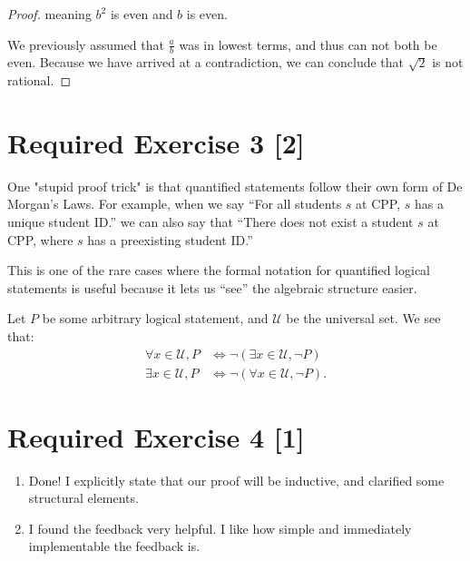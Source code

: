 \documentclass{article}
\begin{document}
\begin{enumerate}
{\begin{proof}
            meaning \(b^2\) is even and \(b\) is even. 

            We previously assumed that \(\frac{a }{b}\) was in lowest terms, and 
            thus can not both be even. Because we have arrived at a contradiction, 
            we can conclude that \(\sqrt{2}\) is not rational. 
        \end{proof}
    }
\end{enumerate}

\section*{Required Exercise 3 [2]}

One "stupid proof trick" is that quantified statements follow their own form of 
De Morgan's Laws. For example, when we say ``For all students \(s\) at CPP, \(s\) 
has a unique student ID.'' we can also say that ``There does not exist a student \(s\)
at CPP, where \(s\) has a preexisting student ID.''

This is one of the rare cases where the formal notation for quantified logical 
statements is useful because it lets us ``see'' the algebraic structure easier. 

Let \(P\) be some arbitrary logical statement, and \(\mathcal{U}\) be the universal set.
We see that:
\begin{align*}
    \forall x \in \mathcal{U}, P &\Leftrightarrow \neg (\exists x \in \mathcal{U}, \neg P)\\
    \exists x \in \mathcal{U}, P &\Leftrightarrow \neg (\forall x \in \mathcal{U}, \neg P).
\end{align*}

\section*{Required Exercise 4 [1]}
\begin{enumerate}
    \item {
        Done! I explicitly state that our proof will be inductive, and clarified 
        some structural elements. 
    }
    \item {
        I found the feedback very helpful. I like how simple and immediately 
        implementable the feedback is. 
    }
\end{enumerate}
\end{document}
